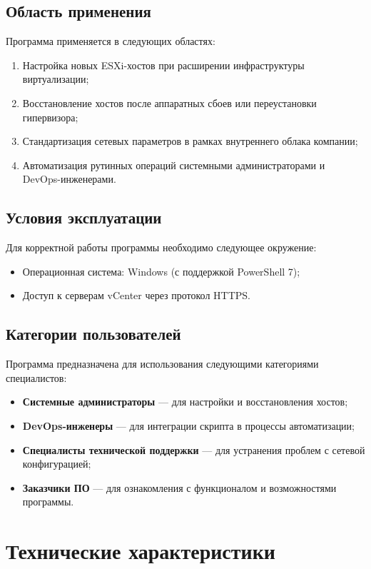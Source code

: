 \subsection{Область применения}
Программа применяется в следующих областях:
\begin{enumerate}
    \item Настройка новых ESXi-хостов при расширении инфраструктуры виртуализации;
    \item Восстановление хостов после аппаратных сбоев или переустановки гипервизора;
    \item Стандартизация сетевых параметров в рамках внутреннего облака компании;
    \item Автоматизация рутинных операций системными администраторами и DevOps-инженерами.
\end{enumerate}

\subsection{Условия эксплуатации}
Для корректной работы программы необходимо следующее окружение:
\begin{itemize}
\item Операционная система: Windows (с поддержкой PowerShell 7);
\item Доступ к серверам vCenter через протокол HTTPS.
\end{itemize}

\subsection{Категории пользователей}
Программа предназначена для использования следующими категориями специалистов:
\begin{itemize}
\item \textbf{Системные администраторы} — для настройки и восстановления хостов;
\item \textbf{DevOps-инженеры} — для интеграции скрипта в процессы автоматизации;
\item \textbf{Специалисты технической поддержки} — для устранения проблем с сетевой конфигурацией;
\item \textbf{Заказчики ПО} — для ознакомления с функционалом и возможностями программы.
\end{itemize}
\newpage

\section{Технические характеристики}
